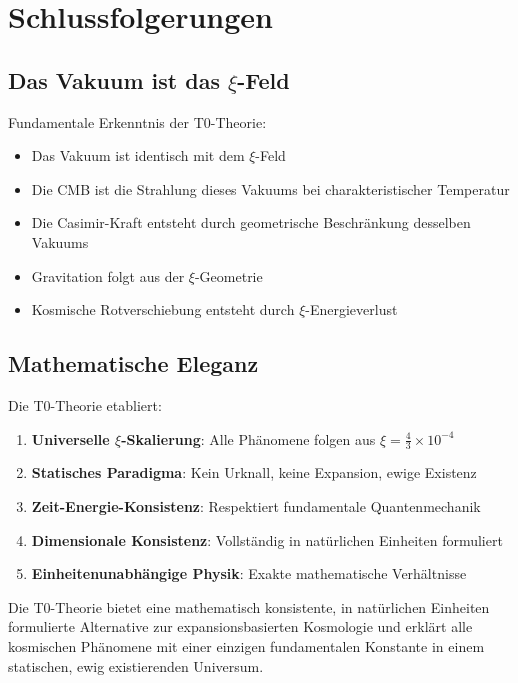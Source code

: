 	\section{Schlussfolgerungen}

	\subsection{Das Vakuum ist das $\xi$-Feld}
	
	\begin{important}
		Fundamentale Erkenntnis der T0-Theorie:
		\begin{itemize}
			\item Das Vakuum ist identisch mit dem $\xi$-Feld
			\item Die CMB ist die Strahlung dieses Vakuums bei charakteristischer Temperatur
			\item Die Casimir-Kraft entsteht durch geometrische Beschränkung desselben Vakuums
			\item Gravitation folgt aus der $\xi$-Geometrie
			\item Kosmische Rotverschiebung entsteht durch $\xi$-Energieverlust
		\end{itemize}
	\end{important}
	
	\subsection{Mathematische Eleganz}
	
	Die T0-Theorie etabliert:
	\begin{enumerate}
		\item \textbf{Universelle $\xi$-Skalierung}: Alle Phänomene folgen aus $\xi = \frac{4}{3} \times 10^{-4}$
		\item \textbf{Statisches Paradigma}: Kein Urknall, keine Expansion, ewige Existenz
		\item \textbf{Zeit-Energie-Konsistenz}: Respektiert fundamentale Quantenmechanik
		\item \textbf{Dimensionale Konsistenz}: Vollständig in natürlichen Einheiten formuliert
		\item \textbf{Einheitenunabhängige Physik}: Exakte mathematische Verhältnisse
	\end{enumerate}
	
	\begin{revolutionary}
		Die T0-Theorie bietet eine mathematisch konsistente, in natürlichen Einheiten formulierte Alternative zur expansionsbasierten Kosmologie und erklärt alle kosmischen Phänomene mit einer einzigen fundamentalen Konstante in einem statischen, ewig existierenden Universum.
	\end{revolutionary}
	
